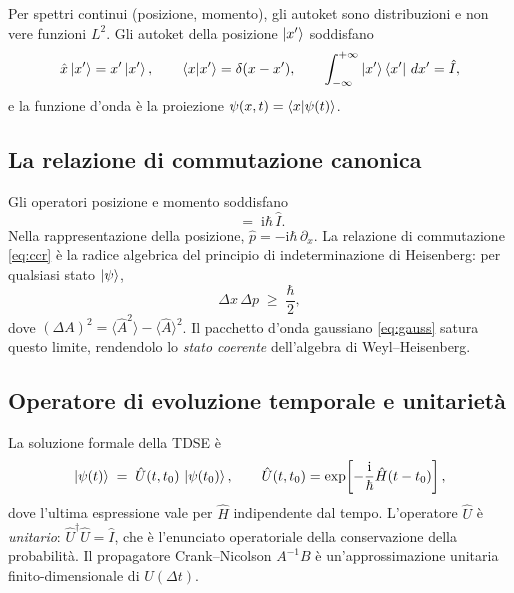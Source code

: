 \documentclass[12pt, a4paper]{article}
\newcommand{\dt}{\Delta t}
\newcommand{\ii}{\mathrm{i}}          %
\newcommand{\CN}{Crank--Nicolson}
\begin{document}
Per spettri continui (posizione, momento), gli autoket sono
distribuzioni e non vere funzioni $L^2$.  Gli autoket della posizione
$\ket{x'}$ soddisfano
\begin{equation}
  \hat{x}\ket{x'} = x'\ket{x'}, \qquad
  \braket{x}{x'} = \delta(x-x'), \qquad
  \int_{-\infty}^{+\infty} \ket{x'}\bra{x'}\,dx' = \hat{I},
\end{equation}
e la funzione d'onda è la proiezione
$\psi(x,t) = \braket{x}{\psi(t)}$.

\subsection{La relazione di commutazione canonica}

Gli operatori posizione e momento soddisfano
\begin{equation}
  [\hat{x},\, \hat{p}] \;=\; \ii\hbar\,\hat{I}.
  \label{eq:ccr}
\end{equation}
Nella rappresentazione della posizione,
$\hat{p} = -\ii\hbar\,\partial_x$.  La relazione di commutazione
\eqref{eq:ccr} è la radice algebrica del principio di indeterminazione
di Heisenberg: per qualsiasi stato $\ket{\psi}$,
\begin{equation}
  \Delta x\,\Delta p \;\geq\; \frac{\hbar}{2},
\end{equation}
dove $(\Delta A)^2 = \langle \hat{A}^2\rangle - \langle\hat{A}\rangle^2$.
Il pacchetto d'onda gaussiano \eqref{eq:gauss} satura questo limite,
rendendolo lo \emph{stato coerente} dell'algebra di Weyl--Heisenberg.

\subsection{Operatore di evoluzione temporale e unitarietà}

La soluzione formale della TDSE è
\begin{equation}
  \ket{\psi(t)} \;=\; \hat{U}(t,t_0)\,\ket{\psi(t_0)},
  \qquad
  \hat{U}(t,t_0) = \exp\!\left[-\frac{\ii}{\hbar}\hat{H}(t-t_0)\right],
\end{equation}
dove l'ultima espressione vale per $\hat{H}$ indipendente dal tempo.
L'operatore $\hat{U}$ è \emph{unitario}:
$\hat{U}^\dagger \hat{U} = \hat{I}$, che è l'enunciato operatoriale
della conservazione della probabilità.  Il propagatore \CN{}
$A^{-1}B$ è un'approssimazione unitaria finito-dimensionale di
$\hat{U}(\dt)$.

\end{document}
